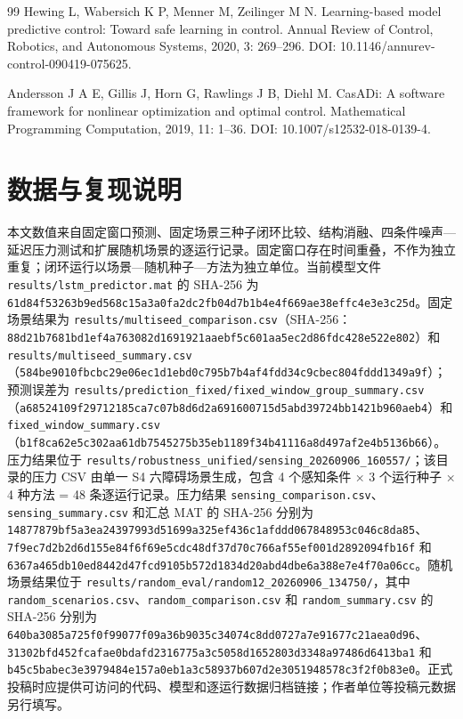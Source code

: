 \documentclass[11pt,a4paper]{ctexart}
\begin{document}
\begin{thebibliography}{99}
 Hewing L, Wabersich K P, Menner M, Zeilinger M N. Learning-based model predictive control: Toward safe learning in control. Annual Review of Control, Robotics, and Autonomous Systems, 2020, 3: 269–296. DOI: 10.1146/annurev-control-090419-075625.

 Andersson J A E, Gillis J, Horn G, Rawlings J B, Diehl M. CasADi: A software framework for nonlinear optimization and optimal control. Mathematical Programming Computation, 2019, 11: 1–36. DOI: 10.1007/s12532-018-0139-4.

\end{thebibliography}

\section{数据与复现说明}

本文数值来自固定窗口预测、固定场景三种子闭环比较、结构消融、四条件噪声—延迟压力测试和扩展随机场景的逐运行记录。固定窗口存在时间重叠，不作为独立重复；闭环运行以场景—随机种子—方法为独立单位。当前模型文件 \texttt{results/lstm\_predictor.mat} 的 SHA-256 为 \texttt{61d84f53263b9ed568c15a3a0fa2dc2fb04d7b1b4e4f669ae38effc4e3e3c25d}。固定场景结果为 \texttt{results/multiseed\_comparison.csv}（SHA-256：\texttt{88d21b7681bd1ef4a763082d1691921aaebf5c601aa5ec2d86fdc428e522e802}）和 \texttt{results/multiseed\_summary.csv}（\texttt{584be9010fbcbc29e06ec1d1ebd0c795b7b4af4fdd34c9cbec804fddd1349a9f}）；预测误差为 \texttt{results/prediction\_fixed/fixed\_window\_group\_summary.csv}（\texttt{a68524109f29712185ca7c07b8d6d2a691600715d5abd39724bb1421b960aeb4}）和 \texttt{fixed\_window\_summary.csv}（\texttt{b1f8ca62e5c302aa61db7545275b35eb1189f34b41116a8d497af2e4b5136b66}）。压力结果位于 \texttt{results/robustness\_unified/sensing\_20260906\_160557/}；该目录的压力 CSV 由单一 S4 六障碍场景生成，包含 4 个感知条件 × 3 个运行种子 × 4 种方法 = 48 条逐运行记录。压力结果 \texttt{sensing\_comparison.csv}、\texttt{sensing\_summary.csv} 和汇总 MAT 的 SHA-256 分别为 \texttt{14877879bf5a3ea24397993d51699a325ef436c1afddd067848953c046c8da85}、\texttt{7f9ec7d2b2d6d155e84f6f69e5cdc48df37d70c766af55ef001d2892094fb16f} 和 \texttt{6367a465db10ed8442d47fcd9105b572d1834d20abd4dbe6a388e7e4f70a06cc}。随机场景结果位于 \texttt{results/random\_eval/random12\_20260906\_134750/}，其中 \texttt{random\_scenarios.csv}、\texttt{random\_comparison.csv} 和 \texttt{random\_summary.csv} 的 SHA-256 分别为 \texttt{640ba3085a725f0f99077f09a36b9035c34074c8dd0727a7e91677c21aea0d96}、\texttt{31302bfd452fcafae0bdafd2316775a3c5058d1652803d3348a97486d6413ba1} 和 \texttt{b45c5babec3e3979484e157a0eb1a3c58937b607d2e3051948578c3f2f0b83e0}。正式投稿时应提供可访问的代码、模型和逐运行数据归档链接；作者单位等投稿元数据另行填写。
\end{document}
